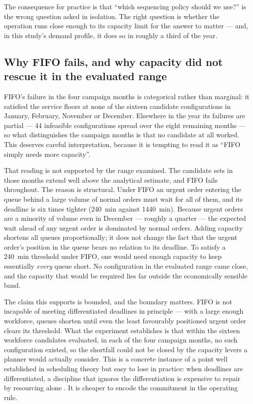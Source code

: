 The consequence for practice is that ``which sequencing policy should we use?'' is the wrong
question asked in isolation. The right question is whether the operation runs close enough to
its capacity limit for the answer to matter --- and, in this study's demand profile, it does so
in roughly a third of the year.

\subsection{Why FIFO fails, and why capacity did not rescue it in the evaluated range}

FIFO's failure in the four campaign months is categorical rather than marginal: it satisfied
the service floors at none of the sixteen candidate configurations in January, February,
November or December. Elsewhere in the year its failures are partial --- \num{44} infeasible
configurations spread over the eight remaining months --- so what distinguishes the campaign
months is
that no candidate at all worked. This deserves careful interpretation, because it is tempting to
read it as ``FIFO simply needs more capacity''.

That reading is not supported by the range examined. The candidate sets in those months extend
well above the analytical estimate, and FIFO fails throughout. The reason is structural. Under FIFO an urgent
order entering the queue behind a large volume of normal orders must wait for all of them, and
its deadline is six times tighter (\SI{240}{\minute} against \SI{1440}{\minute}). Because
urgent orders are a minority of volume even in December --- roughly a quarter --- the expected
wait ahead of any urgent order is dominated by normal orders. Adding capacity shortens all
queues proportionally; it does not change the fact that the urgent order's position in the
queue bears no relation to its deadline. To satisfy a \SI{240}{\minute} threshold under FIFO,
one would need enough capacity to keep essentially \emph{every} queue short. No configuration
in the evaluated range came close, and the capacity that would be required lies far outside the
economically sensible band.

The claim this supports is bounded, and the boundary matters. FIFO is not incapable of meeting
differentiated deadlines in principle --- with a large enough workforce, queues shorten until
even the least favourably positioned urgent order clears its threshold. What the experiment
establishes is that within the sixteen workforce candidates evaluated, in each of the four
campaign months, no such configuration existed, so the shortfall could not be closed by the
capacity levers a planner would actually consider. This is a concrete instance of a point well
established in scheduling theory but easy to lose in practice: when deadlines are
differentiated, a discipline that ignores the differentiation is expensive to repair by
resourcing alone \citep{panwalkar1977}. It is cheaper to encode the commitment in the operating
rule.

